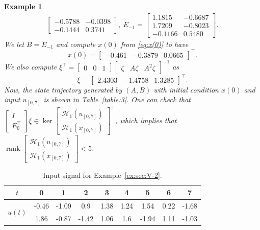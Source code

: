 \documentclass[journal,twoside,web]{ieeecolor}
\newtheorem{example}[theorem]{Example}
\DeclareMathOperator{\rank}{rank}
\begin{document}
\begin{example}
\begin{equation}
\begin{split}
\begin{bmatrix}
-0.5788 & -0.0398 \\
-0.1444 & 0.3741
\end{bmatrix}\!\!,\ E_{-1}\!=\!\begin{bmatrix}
1.1815 & -0.6687 \\
1.7209 & -0.8023 \\
-0.1166 &  0.5480
\end{bmatrix}\!\!.
\end{split}
\end{equation}
We let $B=E_{-1}$ and compute $x(0)$ from \eqref{eq:x(0)} to have
\begin{equation}
x(0)=\begin{bmatrix} -0.461 & -0.3879 & 0.0665 \end{bmatrix}^\top.
\end{equation}
We also compute $\xi^\top=\begin{bmatrix}
0 & 0 & 1
\end{bmatrix}\begin{bmatrix}
\zeta & A\zeta & A^{2}\zeta
\end{bmatrix}^{-1}$ as
\begin{equation}
\xi=\begin{bmatrix}
2.4303 & -1.4758 & 1.3285
\end{bmatrix}^\top.
\end{equation}
Now, the state trajectory generated by $(A,B)$ with initial condition $x(0)$ and input $u_{[0,7]}$ is shown in Table~\ref{table:3}. One can check that $\begin{bmatrix}
I \\ E_0^\top 
\end{bmatrix}\xi \in\ker \begin{bmatrix}
\mathcal{H}_1(u_{[0,7]}) \\
\mathcal{H}_1(x_{[0,7]}) 
\end{bmatrix}^\top$, which implies that $\rank \begin{bmatrix}
\mathcal{H}_1(u_{[0,7]}) \\
\mathcal{H}_1(x_{[0,7]}) 
\end{bmatrix}<5$. 
\end{example}
\begin{table}[h]
    \centering
    \caption{Input signal for Example~\ref{ex:sec:V-2}.}
    \begin{tabular}{c|cccccccc}
       $t$  & 0 & 1 & 2 & 3 & 4 & 5 & 6 & 7 \\ \hline
       \multirow{2}{*}{\!$u(t)$\!} & -0.46 & -1.09 & 0.9  & 1.38 & 1.24  & 1.54 & 0.22 & -1.68 \\
              & 1.86  &  -0.87  & -1.42 & 1.06 & 1.6 & -1.94 & 1.11 & -1.03
    \end{tabular}
    \label{table:2}
\end{table}
\end{document}
